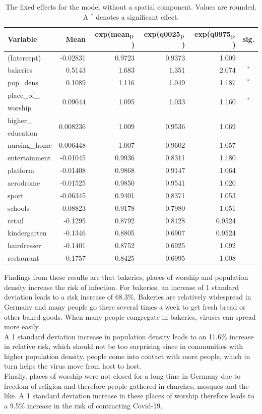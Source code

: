 \begin{table}[H] 
\caption{The fixed effects for the model without a spatial component. Values are rounded. A $^*$ denotes a significant effect.\label{fixedInfraGermany}}
\begin{tabular}{l r r r r c}
\toprule
\textbf{Variable}	& \textbf{Mean}	& \textbf{exp(mean$_{\hbox{p}}$)} & \textbf{exp(q0025$_{\hbox{p}}$)} & \textbf{exp(q0975$_{\hbox{p}}$)} & \textbf{sig.}\\
\midrule
(Intercept) & -0.02831 & 0.9723 & 0.9373 & 1.009 &\\
bakeries & 0.5143 & 1.683 & 1.351 & 2.074 &$^*$\\
pop\_dens & 0.1089 & 1.116 & 1.049 & 1.187 & $^*$\\
place\_of\_ & \multirow{2}{*}{0.09044} & \multirow{2}{*}{1.095} & \multirow{2}{*}{1.033} & \multirow{2}{*}{1.160} &\multirow{2}{*}{$^*$}\\
worship &  \\
higher\_ & \multirow{2}{*}{0.008236} & \multirow{2}{*}{1.009} & \multirow{2}{*}{0.9536} & \multirow{2}{*}{1.069} &\\
education \\
nursing\_home & 0.006448 & 1.007 & 0.9602 & 1.057 &\\
entertainment & -0.01045 & 0.9936 & 0.8311 & 1.180 &\\
platform & -0.01408 & 0.9868 & 0.9147 & 1.064 &\\
aerodrome & -0.01525 & 0.9850 & 0.9541 & 1.020 &\\
sport & -0.06345 & 0.9401 & 0.8371 & 1.053 \\
schools & -0.08823 & 0.9178 & 0.7980 & 1.051 &\\
retail & -0.1295 & 0.8792 & 0.8128 & 0.9524 &\\
kindergarten & -0.1346 & 0.8805 & 0.6907 & 0.9524 &\\
hairdresser & -0.1401 & 0.8752 & 0.6925 & 1.092 &\\
restaurant & -0.1757 & 0.8425 & 0.6995 & 1.008 &\\
\bottomrule
\end{tabular}
\end{table}
Findings from these results are that bakeries, places of worship and population density increase the risk of infection. For bakeries, an increase of 1 standard deviation leads to a risk increase of 68.3\%. Bakeries are relatively widespread in Germany and many people go there several times a week to get fresh bread or other baked goods. When many people congregate in bakeries, viruses can spread more easily. \\
A 1 standard deviation increase in population density leads to an 11.6\% increase in relative risk, which should not be too surprising since in communities with higher population density, people come into contact with more people, which in turn helps the virus move from host to host. \\
Finally, places of worship were not closed for a long time in Germany due to freedom of religion and therefore people gathered in churches, mosques and the like. A 1 standard deviation increase in these places of worship therefore leads to a 9.5\% increase in the risk of contracting Covid-19.
